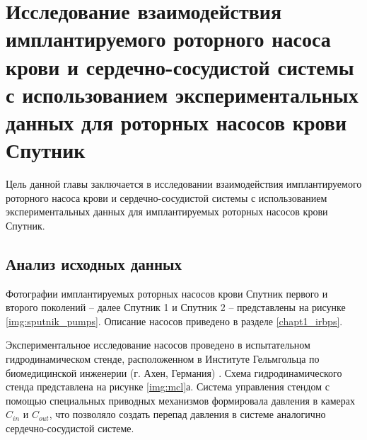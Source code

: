 \chapter{Исследование взаимодействия имплантируемого роторного насоса крови и сердечно-сосудистой системы с использованием экспериментальных данных для роторных насосов крови Спутник} \label{chapt4}

Цель данной главы заключается в исследовании взаимодействия имплантируемого роторного насоса крови и сердечно-сосудистой системы с использованием экспериментальных данных для имплантируемых роторных насосов крови Спутник. %

\section{Анализ исходных данных}

Фотографии имплантируемых роторных насосов крови Спутник первого и второго поколений -- далее Спутник 1 и Спутник 2 -- представлены на рисунке \ref{img:sputnik_pumps}. Описание насосов приведено в разделе \ref{chapt1_irbps}.



Экспериментальное исследование насосов проведено в испытательном гидродинамическом стенде, расположенном в Институте Гельмгольца по биомедицинской инженерии (г. Ахен, Германия) \cite{Misgeld201535,heinke_modeling_2015}. Схема гидродинамического стенда представлена на рисунке \ref{img:mcl}а. Система управления стендом с помощью специальных приводных механизмов формировала давления в камерах $C_{in}$ и $C_{out}$, что позволяло создать перепад давления в системе аналогично сердечно-сосудистой системе.

